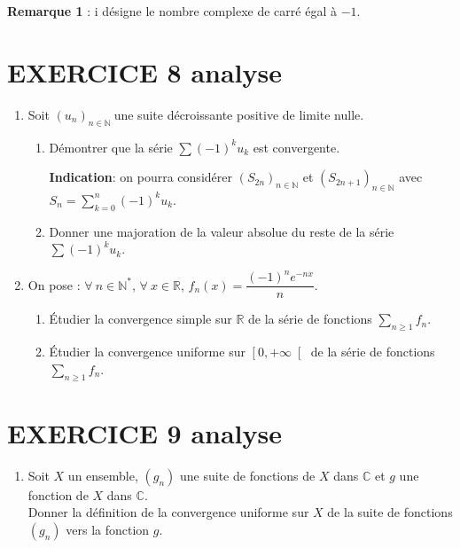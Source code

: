 \documentclass[10pt,oneside]{article}
\begin{document}
\begin{flushleft}
\begin{enumerate}
\textbf{Remarque 1} : $\mathrm{i}$ désigne le nombre complexe de carr\'{e} \'{e}gal \`{a} $-1$.\\

\end{enumerate}


\section*{EXERCICE 8 \:analyse }


\begin{enumerate}
\item 
Soit $\left( u_{n}\right) _{n\in \mathbb{N}}\ $une suite d\'{e}croissante positive de limite nulle.
\begin{enumerate}
\item Démontrer que la s\'{e}rie $\displaystyle\sum \left( -1\right) ^{k}u_{k}$ est convergente.

\textbf{Indication}: on pourra consid\'{e}rer $\left( S_{2n}\right) _{n\in \mathbb{N}}$ et $\left( S_{2n+1}\right) _{n\in \mathbb{N}}$ avec $S_{n}=\displaystyle\sum_{k=0}^{n}\left( -1\right) ^{k}u_{k}$.
\item Donner une majoration de la valeur absolue du reste de la série $\displaystyle\sum \left( -1\right) ^{k}u_{k}$.
\end{enumerate}
\item 
On pose : $\forall \:n\in\mathbb{N}^*$, $\forall\:x\in\mathbb{R}$, $f_n(x)=\dfrac{\left(-1\right)^{n}e^{-nx}}{n}$.
\begin{enumerate}

\item \'Etudier la convergence simple sur $\mathbb{R}$  de la série de fonctions $\displaystyle\sum_{n\geqslant1}^{}f_n$.
\item
\'Etudier la convergence uniforme sur $\left[ 0,+\infty\right[ $  de la série de fonctions $\displaystyle\sum_{n\geqslant1}^{}f_n$. 
\end{enumerate}
\end{enumerate}

\section*{EXERCICE 9 \:analyse }

\begin{enumerate}
\item 
 Soit $X$ un ensemble, $\left( g_{n}\right) $ une suite de fonctions de $X$ dans $\mathbb{C}$ et $g$ une fonction de $X$ dans $\mathbb{C}$.\\
Donner la définition de la convergence uniforme sur $X$ de la suite de fonctions $\left(g_n\right)$ vers la fonction $g$.\\


\end{enumerate}
\end{flushleft}
\end{document}
